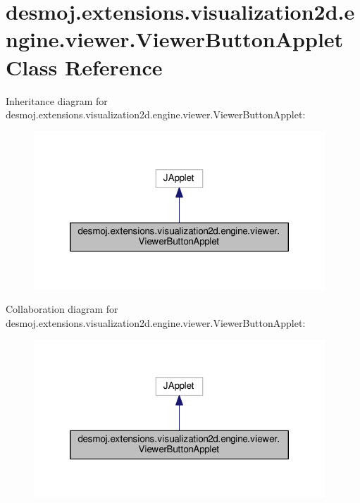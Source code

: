\section{desmoj.\-extensions.\-visualization2d.\-engine.\-viewer.\-Viewer\-Button\-Applet Class Reference}
\label{classdesmoj_1_1extensions_1_1visualization2d_1_1engine_1_1viewer_1_1_viewer_button_applet}


Inheritance diagram for desmoj.\-extensions.\-visualization2d.\-engine.\-viewer.\-Viewer\-Button\-Applet\-:
\nopagebreak
\begin{figure}[H]
\begin{center}
\leavevmode
\includegraphics[width=310pt]{classdesmoj_1_1extensions_1_1visualization2d_1_1engine_1_1viewer_1_1_viewer_button_applet__inherit__graph}
\end{center}
\end{figure}


Collaboration diagram for desmoj.\-extensions.\-visualization2d.\-engine.\-viewer.\-Viewer\-Button\-Applet\-:
\nopagebreak
\begin{figure}[H]
\begin{center}
\leavevmode
\includegraphics[width=310pt]{classdesmoj_1_1extensions_1_1visualization2d_1_1engine_1_1viewer_1_1_viewer_button_applet__coll__graph}
\end{center}
\end{figure}
